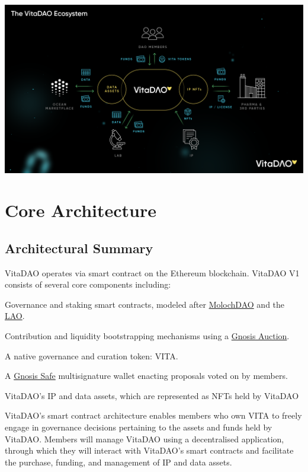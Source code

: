 \documentclass[10pt,letterpaper]{article}
\newenvironment{tight_enumerate}{
\begin{enumerate}
  \setlength{\itemsep}{0pt}
  \setlength{\parskip}{0pt}
}{\end{enumerate}}
\begin{document}
\vspace{15pt}
\begin{center}
\includegraphics[width=\linewidth]{images/VitaDAO Diagram - Ecosystem-p-1600.png} 
\end{center}

\section{Core Architecture}

\subsection{Architectural Summary}
VitaDAO operates via smart contract on the Ethereum blockchain. VitaDAO V1 consists of several core components including: 

\begin{tight_enumerate}
\item Governance and staking smart contracts, modeled after \href{https://github.com/MolochVentures}{MolochDAO} and the \href{https://github.com/openlawteam/TheLAO}{LAO}.
\item Contribution and liquidity bootstrapping mechanisms using a \href{https://gnosis-auction.eth.link/#/docs#topAnchor}{Gnosis Auction}. 
\item A native governance and curation token: VITA.
\item A \href{https://github.com/gnosis/safe-contracts}{Gnosis Safe} multisignature wallet enacting proposals voted on by members.
\item VitaDAO’s IP and data assets, which are represented as NFTs held by VitaDAO 
\end{tight_enumerate}

VitaDAO’s smart contract architecture enables members who own VITA to freely engage in governance decisions pertaining to the assets and funds held by VitaDAO. Members will manage VitaDAO using a decentralised application, through which they will interact with VitaDAO’s smart contracts and facilitate the purchase, funding, and management of IP and data assets.
\end{document}
